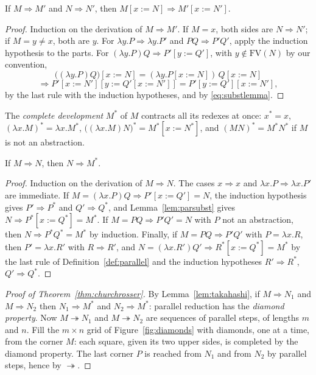 \begin{lemma}\label{lem:parsubst}
If $M\Rightarrow M'$ and $N\Rightarrow N'$, then $M[x:=N]\Rightarrow M'[x:=N']$.
\end{lemma}

\begin{proof}
Induction on the derivation of $M\Rightarrow M'$. If $M=x$, both sides are $N\Rightarrow N'$; if $M=y\ne x$, both are $y$. For $\lambda y.P\Rightarrow\lambda y.P'$ and $PQ\Rightarrow P'Q'$, apply the induction hypothesis to the parts. For $(\lambda y.P)Q\Rightarrow P'[y:=Q']$, with $y\notin\mathrm{FV}(N)$ by our convention,
\[
\bigl((\lambda y.P)Q\bigr)[x:=N]=(\lambda y.P[x:=N])\,Q[x:=N]
\]
\[
\Rightarrow P'[x:=N'][y:=Q'[x:=N']]=P'[y:=Q'][x:=N'],
\]
by the last rule with the induction hypotheses, and by \eqref{eq:substlemma}.
\end{proof}

\begin{definition}\label{def:development}
The \emph{complete development} $M^*$ of $M$ contracts all its redexes at once: $x^*=x$, $(\lambda x.M)^*=\lambda x.M^*$, $\bigl((\lambda x.M)N\bigr)^*=M^*[x:=N^*]$, and $(MN)^*=M^*N^*$ if $M$ is not an abstraction.
\end{definition}

\begin{lemma}[Takahashi]\label{lem:takahashi}
If $M\Rightarrow N$, then $N\Rightarrow M^*$.
\end{lemma}

\begin{proof}
Induction on the derivation of $M\Rightarrow N$. The cases $x\Rightarrow x$ and $\lambda x.P\Rightarrow\lambda x.P'$ are immediate. If $M=(\lambda x.P)Q\Rightarrow P'[x:=Q']=N$, the induction hypothesis gives $P'\Rightarrow P^*$ and $Q'\Rightarrow Q^*$, and Lemma~\ref{lem:parsubst} gives $N\Rightarrow P^*[x:=Q^*]=M^*$. If $M=PQ\Rightarrow P'Q'=N$ with $P$ not an abstraction, then $N\Rightarrow P^*Q^*=M^*$ by induction. Finally, if $M=PQ\Rightarrow P'Q'$ with $P=\lambda x.R$, then $P'=\lambda x.R'$ with $R\Rightarrow R'$, and $N=(\lambda x.R')Q'\Rightarrow R^*[x:=Q^*]=M^*$ by the last rule of Definition~\ref{def:parallel} and the induction hypotheses $R'\Rightarrow R^*$, $Q'\Rightarrow Q^*$.
\end{proof}

\begin{proof}[Proof of Theorem~\ref{thm:churchrosser}]
By Lemma~\ref{lem:takahashi}, if $M\Rightarrow N_1$ and $M\Rightarrow N_2$ then $N_1\Rightarrow M^*$ and $N_2\Rightarrow M^*$: parallel reduction has the \emph{diamond property}. Now $M\twoheadrightarrow N_1$ and $M\twoheadrightarrow N_2$ are sequences of parallel steps, of lengths $m$ and $n$. Fill the $m\times n$ grid of Figure~\ref{fig:diamonds} with diamonds, one at a time, from the corner $M$: each square, given its two upper sides, is completed by the diamond property. The last corner $P$ is reached from $N_1$ and from $N_2$ by parallel steps, hence by $\twoheadrightarrow$.
\end{proof}

